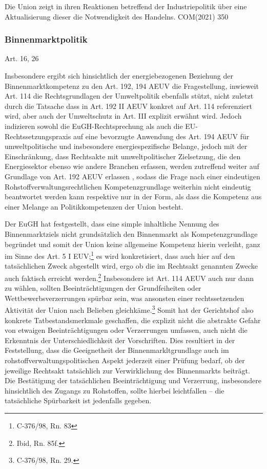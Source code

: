 \documentclass[12pt,a4paper,oneside]{book} %
\begin{document}
	Die Union zeigt in ihren Reaktionen betreffend der Industriepolitik über eine Aktualisierung dieser die Notwendigkeit des Handelns.
	COM(2021) 350
	
	\subsubsection{Binnenmarktpolitik}
	Art. 16, 26
	
	Insbesondere ergibt sich hinsichtlich der energiebezogenen Beziehung der Binnenmarktkompetenz zu den Art. 192, 194 AEUV die Fragestellung, inwieweit Art. 114 die Rechtsgrundlagen der Umweltpolitik ebenfalls stützt, nicht zuletzt durch die Tatsache dass in Art. 192 II AEUV konkret auf Art. 114 referenziert wird, aber auch der Umweltschutz in Art. III explizit erwähnt wird.\autocite[siehe insbesondere hierzu Gundel §m Rn 28f]{dauses_handbuch_2024} Jedoch indizieren sowohl die EuGH-Rechtsprechung als auch die EU-Rechtssetzungspraxis auf eine bevorzugte Anwendung des Art. 194 AEUV für umweltpolitische und insbesondere energiespezifische Belange, jedoch mit der Einschränkung, dass \glqq Rechtsakte mit umweltpolitischer Zielsetzung, die den Energiesektor ebenso wie andere Branchen erfassen, werden zutreffend weiter auf Grundlage von Art. 192 AEUV erlassen \grqq\autocite[Gundel §m Rn 29]{dauses_handbuch_2024}, sodass die Frage nach einer eindeutigen Rohstoffverwaltungsrechtlichen Kompetenzgrundlage weiterhin nicht eindeutig beantwortet werden kann respektive nur in der Form, als dass die Kompetenz aus einer Melange an Politikkompetenzen der Union besteht.
	
	Der EuGH hat festgestellt, dass eine simple inhaltliche Nennung des Binnenmarktziels nicht grundsätzlich den Binnenmarkt als Kompetenzgrundlage begründet und somit der Union keine allgemeine Kompetenz hierin verleiht, ganz im Sinne des Art. 5 I EUV;\footnote{C-376/98, Rn. 83} es wird konkretisiert, dass auch hier auf den tatsächlichen Zweck abgestellt wird, ergo ob die im Rechtsakt genannten Zwecke auch faktisch erreicht werden.\footnote{Ibid, Rn. 85f.} Insbesondere ist Art. 114 AEUV auch nur dann zu wählen, sollten Beeinträchtigungen der Grundfeiheiten oder Wettbewerbsverzerrungen spürbar sein, was ansonsten einer rechtssetzenden Aktivität der Union nach Belieben gleichkäme.\footnote{C-376/98, Rn. 29.} Somit hat der Gerichtshof also konkrete Tatbestandsmerkmale geschaffen, die explizit nicht die abstrakte Gefahr von etwaigen Beeinträchtigungen oder Verzerrungen umfassen, auch nicht die Erkenntnis der Unterschiedlichkeit der Vorschriften.\autocite[hierzu ausführlich]{Callies, Berliner Beiträge 117, S. 16}
	Dies resultiert in der Feststellung, dass die Geeignetheit der Binnenmarkltgrundlage auch im rohstoffverwaltungspolitischen Aspekt jederzeit einer Prüfung bedarf, ob der jeweilige Rechtsakt tatsächlich zur Verwirklichung des Binnenmarkts beiträgt. Die Bestätigung der tatsächlichen Beeinträchtigung und Verzerrung, insbesondere hinsichtlich des Zugangs zu Rohstoffen, sollte hierbei leichtfallen -- die tatsächliche Spürbarkeit ist jedenfalls gegeben.
	
\end{document}
